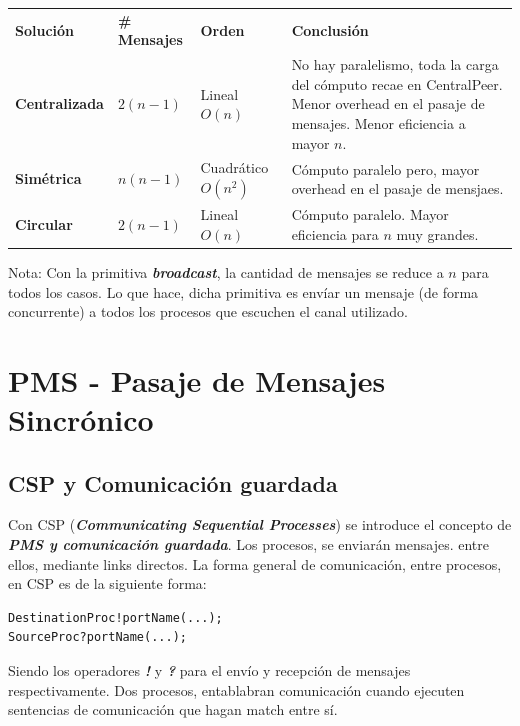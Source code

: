 \documentclass[a4paper, 10pt]{report}
\begin{document}
{\renewcommand{\arraystretch}{2}%
\begin{center}
\begin{tabular}{p{2.5cm} p{3cm} p{1.8cm} p{7.5cm} }
\textbf{Solución} &  \textbf{\# Mensajes} & \textbf{Orden} & \textbf{Conclusión} \\
\textbf{Centralizada} & $2(n-1)$ & Lineal \newline $O(n)$ & No hay paralelismo, toda la carga del cómputo recae en CentralPeer. Menor overhead en el pasaje de mensajes. Menor eficiencia a mayor $n$. \\
\hline
\textbf{Simétrica} & $n(n-1)$&  Cuadrático \newline $O(n^2)$& Cómputo paralelo pero, mayor overhead en el pasaje de mensjaes.\\
\hline
\textbf{Circular} &  $2(n-1)$& Lineal \newline $O(n)$ & Cómputo paralelo. Mayor eficiencia para $n$ muy grandes.
\end{tabular}
\end{center}}

Nota: Con la primitiva \textbf{\emph{broadcast}}, la cantidad de mensajes se reduce a $n$ para todos los casos. Lo que hace, dicha primitiva es envíar un mensaje (de forma concurrente) a todos los procesos que escuchen el canal utilizado.

\chapter{PMS - Pasaje de Mensajes Sincrónico}

\section{CSP y Comunicación guardada}

Con CSP (\textbf{\emph{Communicating Sequential Processes}}) se introduce el concepto de \textbf{\emph{PMS y comunicación guardada}}. Los procesos, se enviarán mensajes. entre ellos, mediante links directos. La forma general de comunicación, entre procesos, en CSP es de la siguiente forma:

\begin{lstlisting}
DestinationProc!portName(...);
SourceProc?portName(...);
\end{lstlisting}

Siendo los operadores \textbf{\emph{!}} y \textbf{\emph{?}} para el envío y recepción de mensajes respectivamente. Dos procesos, entablabran comunicación cuando ejecuten sentencias de comunicación que hagan match entre sí. 
\end{document}
